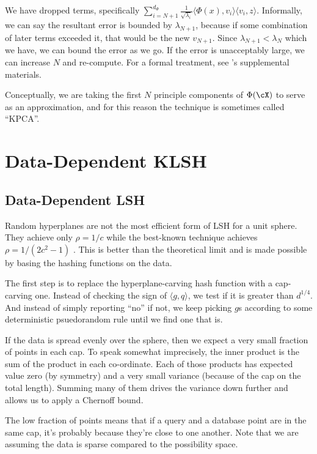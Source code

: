 \documentclass[twoside,11pt]{homework}
\begin{document}
\begin{multicols}{2}
We have dropped terms, specifically $\sum_{i=N+1}^{d_\Phi}
\frac{1}{\sqrt{\lambda_i}} \langle \Phi(x), v_i\rangle \langle v_i ,
z\rangle$.  Informally, we can say the resultant error is bounded by
$\lambda_{N+1}$, because if some combination of later terms exceeded
it, that would be the new $v_{N+1}$.  Since $\lambda_{N+1}<\lambda_N$
which we have, we can bound the error as we go.  If the error is
unacceptably large, we can increase $N$ and re-compute.  For a formal
treatment, see \cite{J2015}'s supplemental materials.

Conceptually, we are taking the first $N$ principle components of
$\Phi(\cX)$ to serve as an approximation, and for this reason the
technique is sometimes called ``KPCA''.

\section{Data-Dependent KLSH} %

\subsection{Data-Dependent LSH}

Random hyperplanes are not the most efficient form of LSH for a unit
sphere.  They achieve only $\rho=1/c$ while the best-known
technique achieves $\rho=1/(2c^2-1)$ \cite{AR15}.  This is better than the
theoretical limit and is made possible by basing the hashing functions
on the data.

The first step is to replace the hyperplane-carving hash function with
a cap-carving one.  Instead of checking the sign of $\langle g, q
\rangle$, we test if it is greater than $d^{1/4}$.  And
instead of simply reporting ``no'' if not, we keep picking $g$s
according to some deterministic psuedorandom rule until we find one
that is.

If the data is spread evenly over the sphere, then we expect a very
small fraction of points in each cap.  To speak somewhat imprecisely,
the inner product is the sum of the product in each co-ordinate.  Each
of those products has expected value zero (by symmetry) and a very
small variance (because of the cap on the total length).  Summing many
of them drives the variance down further and allows us to apply a
Chernoff bound.

The low fraction of points means that if a query and a database point
are in the same cap, it's probably because they're close to one
another.  Note that we are assuming the data is sparse compared to
the possibility space.


\end{multicols}
\end{document}
